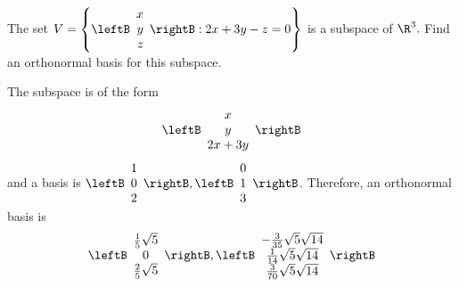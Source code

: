 \begin{enumialphparenastyle}
\begin{ex} The set $V =  \left\{ \leftB
\begin{array}{r}
 x \\
y \\
z
\end{array}
\rightB :2x+3y-z=0\right\} $ is
a subspace of $\R^{3}.$ Find an orthonormal basis for this subspace.
\begin{sol}
The subspace is of the form
\[
\leftB
\begin{array}{c}
x \\
y \\
2x+3y
\end{array}
\rightB
\]
and a basis is $\leftB
\begin{array}{c}
1 \\
0 \\
2
\end{array}
\rightB ,\leftB
\begin{array}{c}
0 \\
1 \\
3
\end{array}
\rightB $. Therefore, an orthonormal basis is
\[
\leftB
\begin{array}{c}
\frac{1}{5}\sqrt{5} \\
0 \\
\frac{2}{5}\sqrt{5}
\end{array}
\rightB ,\leftB
\begin{array}{c}
-\frac{3}{35}\sqrt{5}\sqrt{14} \\
\frac{1}{14}\sqrt{5}\sqrt{14} \\
\frac{3}{70}\sqrt{5}\sqrt{14}
\end{array}
\rightB
\]
\end{sol}
\end{ex}

\end{enumialphparenastyle}